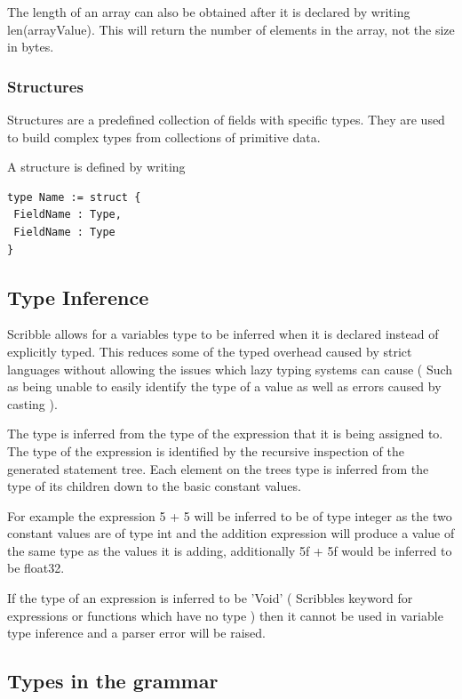 \documentclass[]{final_report}
\begin{document}
The length of an array can also be obtained after it is declared by writing len(arrayValue). This will return the number of elements in the array, not the size in bytes.

\subsubsection{Structures}

Structures are a predefined collection of fields with specific types. They are used to build complex types from collections of primitive data.

A structure is defined by writing
\begin{verbatim}
type Name := struct {
 FieldName : Type,
 FieldName : Type
}
\end{verbatim}

\subsection{Type Inference}

Scribble allows for a variables type to be inferred when it is declared instead of explicitly typed. This reduces some of the typed overhead caused by strict languages without allowing the issues which lazy typing systems can cause ( Such as being unable to easily identify the type of a value as well as errors caused by casting ).

The type is inferred from the type of the expression that it is being assigned to. The type of the expression is identified by the recursive inspection of the generated statement tree. Each element on the trees type is inferred from the type of its children down to the basic constant values.

For example the expression 5 + 5 will be inferred to be of type integer as the two constant values are of type int and the addition expression will produce a value of the same type as the values it is adding, additionally 5f + 5f would be inferred to be float32.

If the type of an expression is inferred to be 'Void' ( Scribbles keyword for expressions or functions which have no type ) then it cannot be used in variable type inference and a parser error will be raised.

\subsection{Types in the grammar}
\end{document}
